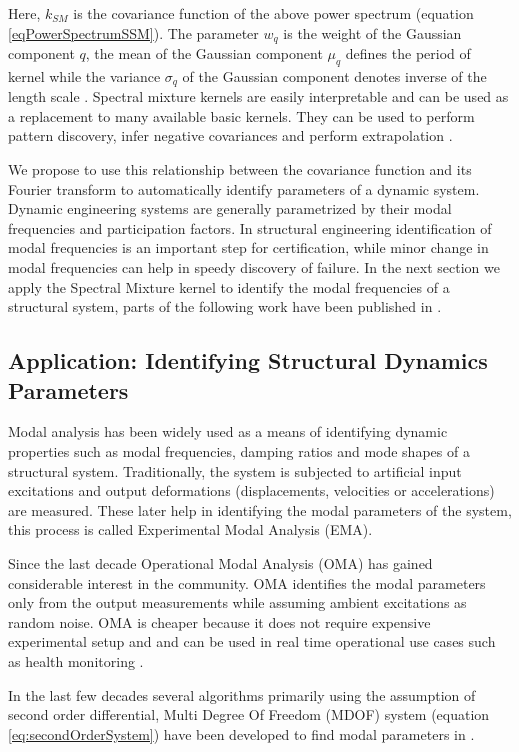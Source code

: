 Here, $k_{SM}$ is the covariance function of the above power spectrum (equation \ref{eqPowerSpectrumSSM}). The parameter $w_{q}$ is the weight of the Gaussian component $q$, the mean of the Gaussian component $\mu_{q}$ defines the period of kernel while the variance $\sigma_{q}$ of the Gaussian component denotes inverse of the length scale . Spectral mixture kernels are easily interpretable and can be used as a replacement to many available basic kernels. They can be used to perform pattern discovery, infer negative covariances and perform extrapolation \cite{wilson2014thesis}. 

We propose to use this relationship between the covariance function and its Fourier transform to automatically identify parameters of a dynamic system. Dynamic engineering systems are generally parametrized by their modal frequencies and participation factors. In structural engineering identification of modal frequencies is an important step for certification, while minor change in modal frequencies can help in speedy discovery of failure. In the next section we apply the Spectral Mixture kernel to identify the modal frequencies of a structural system, parts of the following work have been published in \cite{chiplunkar2017operational}.

\subsection{Application: Identifying Structural Dynamics Parameters}\label{subSecSMKernelApplication}
Modal analysis has been widely used as a means of identifying dynamic properties such as modal frequencies, damping ratios and mode shapes of a structural system. Traditionally, the system is subjected to artificial input excitations and output deformations (displacements, velocities or accelerations) are measured. These later help in identifying the modal parameters of the system, this process is called Experimental Modal Analysis (EMA). 

Since the last decade Operational Modal Analysis (OMA) has gained considerable interest in the community. OMA identifies the modal parameters only from the output measurements while assuming ambient excitations as random noise. OMA is cheaper because it does not require expensive experimental setup and and can be used in real time operational use cases such as health monitoring \cite{peeters2005industrial, shahdin2010correlating, rainieri2007automated}. 

In the last few decades several algorithms primarily using the assumption of second order differential, Multi Degree Of Freedom (MDOF) system (equation \ref{eq:secondOrderSystem}) have been developed to find modal parameters in \cite{guillaume2003poly, richardson1982parameter}.

